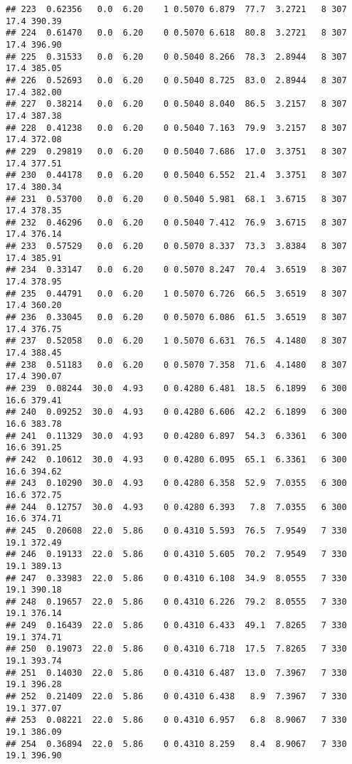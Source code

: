 \documentclass[
]{article}
\begin{document}
\begin{verbatim}
## 223  0.62356   0.0  6.20    1 0.5070 6.879  77.7  3.2721   8 307    17.4 390.39
## 224  0.61470   0.0  6.20    0 0.5070 6.618  80.8  3.2721   8 307    17.4 396.90
## 225  0.31533   0.0  6.20    0 0.5040 8.266  78.3  2.8944   8 307    17.4 385.05
## 226  0.52693   0.0  6.20    0 0.5040 8.725  83.0  2.8944   8 307    17.4 382.00
## 227  0.38214   0.0  6.20    0 0.5040 8.040  86.5  3.2157   8 307    17.4 387.38
## 228  0.41238   0.0  6.20    0 0.5040 7.163  79.9  3.2157   8 307    17.4 372.08
## 229  0.29819   0.0  6.20    0 0.5040 7.686  17.0  3.3751   8 307    17.4 377.51
## 230  0.44178   0.0  6.20    0 0.5040 6.552  21.4  3.3751   8 307    17.4 380.34
## 231  0.53700   0.0  6.20    0 0.5040 5.981  68.1  3.6715   8 307    17.4 378.35
## 232  0.46296   0.0  6.20    0 0.5040 7.412  76.9  3.6715   8 307    17.4 376.14
## 233  0.57529   0.0  6.20    0 0.5070 8.337  73.3  3.8384   8 307    17.4 385.91
## 234  0.33147   0.0  6.20    0 0.5070 8.247  70.4  3.6519   8 307    17.4 378.95
## 235  0.44791   0.0  6.20    1 0.5070 6.726  66.5  3.6519   8 307    17.4 360.20
## 236  0.33045   0.0  6.20    0 0.5070 6.086  61.5  3.6519   8 307    17.4 376.75
## 237  0.52058   0.0  6.20    1 0.5070 6.631  76.5  4.1480   8 307    17.4 388.45
## 238  0.51183   0.0  6.20    0 0.5070 7.358  71.6  4.1480   8 307    17.4 390.07
## 239  0.08244  30.0  4.93    0 0.4280 6.481  18.5  6.1899   6 300    16.6 379.41
## 240  0.09252  30.0  4.93    0 0.4280 6.606  42.2  6.1899   6 300    16.6 383.78
## 241  0.11329  30.0  4.93    0 0.4280 6.897  54.3  6.3361   6 300    16.6 391.25
## 242  0.10612  30.0  4.93    0 0.4280 6.095  65.1  6.3361   6 300    16.6 394.62
## 243  0.10290  30.0  4.93    0 0.4280 6.358  52.9  7.0355   6 300    16.6 372.75
## 244  0.12757  30.0  4.93    0 0.4280 6.393   7.8  7.0355   6 300    16.6 374.71
## 245  0.20608  22.0  5.86    0 0.4310 5.593  76.5  7.9549   7 330    19.1 372.49
## 246  0.19133  22.0  5.86    0 0.4310 5.605  70.2  7.9549   7 330    19.1 389.13
## 247  0.33983  22.0  5.86    0 0.4310 6.108  34.9  8.0555   7 330    19.1 390.18
## 248  0.19657  22.0  5.86    0 0.4310 6.226  79.2  8.0555   7 330    19.1 376.14
## 249  0.16439  22.0  5.86    0 0.4310 6.433  49.1  7.8265   7 330    19.1 374.71
## 250  0.19073  22.0  5.86    0 0.4310 6.718  17.5  7.8265   7 330    19.1 393.74
## 251  0.14030  22.0  5.86    0 0.4310 6.487  13.0  7.3967   7 330    19.1 396.28
## 252  0.21409  22.0  5.86    0 0.4310 6.438   8.9  7.3967   7 330    19.1 377.07
## 253  0.08221  22.0  5.86    0 0.4310 6.957   6.8  8.9067   7 330    19.1 386.09
## 254  0.36894  22.0  5.86    0 0.4310 8.259   8.4  8.9067   7 330    19.1 396.90

\end{verbatim}
\end{document}
